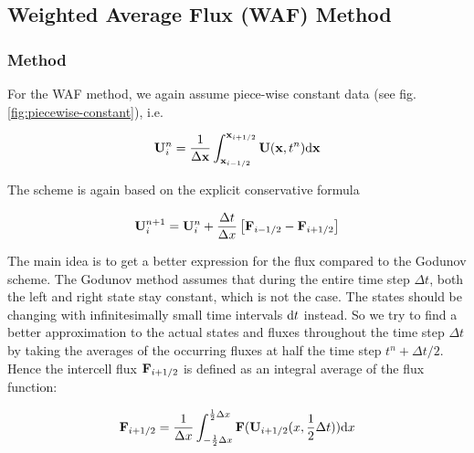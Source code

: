 





\subsection{Weighted Average Flux (WAF) Method}\label{chap:hydro-WAF}







\subsubsection{Method}


For the WAF method, we again assume piece-wise constant data (see fig. \ref{fig:piecewise-constant}), i.e.

\begin{equation}
	\mathbf{U}_i ^ n = \frac{1}{\Delta \mathbf{x}} \int_{\mathbf{x}_{i-1/2}}^{\mathbf{x}_{i+1/2}} \mathbf{U}(\mathbf{x}, t^n) \mathrm{d} \mathbf{x}
\end{equation}

The scheme is again based on the explicit conservative formula

\begin{equation}
	\mathbf{U}_{i}^{n+1} = \mathbf{U}_i^n + \frac{\Delta t}{\Delta x} \left[ \mathbf{F}_{i - 1/2} - \mathbf{F}_{i + 1/2} \right] \label{eq:hydro_basics_waf}
\end{equation}


The main idea is to get a better expression for the flux compared to the Godunov scheme.
The Godunov method assumes that during the entire time step $\Delta t$, both the left and right state stay constant, which is not the case.
The states should be changing with infinitesimally small time intervals $\mathrm{d} t$ instead.
So we try to find a better approximation to the actual states and fluxes throughout the time step $\Delta t$ by taking the averages of the occurring fluxes at half the time step $t^n + \Delta t / 2$.
Hence the intercell flux $\mathbf{F}_{i + 1/2}$ is defined as an integral average of the flux function:


\begin{equation}
	\mathbf{F}_{i + 1/2} = \frac{1}{\Delta x} \int_{-\frac{1}{2} \Delta x} ^{\frac{1}{2} \Delta x} \mathbf{F} (\mathbf{U}_{i+1/2} ( x, \frac{1}{2}\Delta t)) \mathrm{d} x \label{eq:hydro-waf-flux}
\end{equation}

